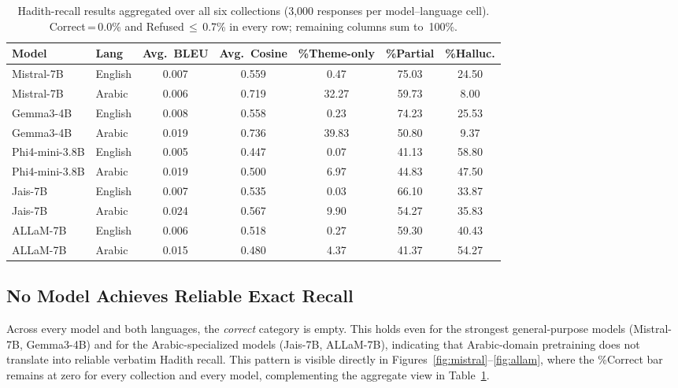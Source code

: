 \documentclass{article}
\begin{document}
\begin{table}[t]
  \centering
  \caption{Hadith-recall results aggregated over all six collections
    (3,000 responses per model--language cell). Correct\,=\,0.0\% and
    Refused\,$\le$\,0.7\% in every row; remaining columns sum to~100\%.}
  \label{tab:main-results}
  \small
  \setlength{\tabcolsep}{6pt}
  \begin{tabular}{llccccc}
    \toprule
    \textbf{Model} & \textbf{Lang}
      & \textbf{Avg.\ BLEU}
      & \textbf{Avg.\ Cosine}
      & \textbf{\%Theme-only}
      & \textbf{\%Partial}
      & \textbf{\%Halluc.} \\
    \midrule
    Mistral-7B     & English & 0.007 & 0.559 &  0.47 & 75.03 & 24.50 \\
    Mistral-7B     & Arabic  & 0.006 & 0.719 & 32.27 & 59.73 &  8.00 \\[3pt]
    Gemma3-4B      & English & 0.008 & 0.558 &  0.23 & 74.23 & 25.53 \\
    Gemma3-4B      & Arabic  & 0.019 & 0.736 & 39.83 & 50.80 &  9.37 \\[3pt]
    Phi4-mini-3.8B & English & 0.005 & 0.447 &  0.07 & 41.13 & 58.80 \\
    Phi4-mini-3.8B & Arabic  & 0.019 & 0.500 &  6.97 & 44.83 & 47.50 \\[3pt]
    Jais-7B        & English & 0.007 & 0.535 &  0.03 & 66.10 & 33.87 \\
    Jais-7B        & Arabic  & 0.024 & 0.567 &  9.90 & 54.27 & 35.83 \\[3pt]
    ALLaM-7B       & English & 0.006 & 0.518 &  0.27 & 59.30 & 40.43 \\
    ALLaM-7B       & Arabic  & 0.015 & 0.480 &  4.37 & 41.37 & 54.27 \\
    \bottomrule
  \end{tabular}
\end{table}

\subsection{No Model Achieves Reliable Exact Recall}
Across every model and both languages, the \emph{correct} category is empty.
This holds even for the strongest general-purpose models (Mistral-7B,
Gemma3-4B) and for the Arabic-specialized models (Jais-7B, ALLaM-7B),
indicating that Arabic-domain pretraining does not translate into reliable
verbatim Hadith recall. This pattern is visible directly in
Figures~\ref{fig:mistral}--\ref{fig:allam}, where the \%Correct bar remains
at zero for every collection and every model, complementing the aggregate
view in Table~\ref{tab:main-results}.
\end{document}
